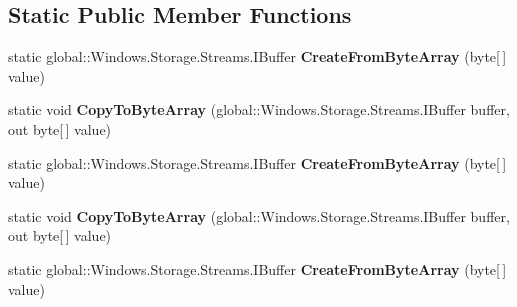 \subsection*{Static Public Member Functions}
\begin{DoxyCompactItemize}
\item 
\mbox{\label{class_windows_1_1_security_1_1_cryptography_1_1_cryptographic_buffer_a9b2cc70a831cb99787d82c5485f22336}} 
static global\+::\+Windows.\+Storage.\+Streams.\+I\+Buffer {\bfseries Create\+From\+Byte\+Array} (byte\mbox{[}$\,$\mbox{]} value)
\item 
\mbox{\label{class_windows_1_1_security_1_1_cryptography_1_1_cryptographic_buffer_a7ee39bbf3affcdc23c5f7bff32232eeb}} 
static void {\bfseries Copy\+To\+Byte\+Array} (global\+::\+Windows.\+Storage.\+Streams.\+I\+Buffer buffer, out byte\mbox{[}$\,$\mbox{]} value)
\item 
\mbox{\label{class_windows_1_1_security_1_1_cryptography_1_1_cryptographic_buffer_a9b2cc70a831cb99787d82c5485f22336}} 
static global\+::\+Windows.\+Storage.\+Streams.\+I\+Buffer {\bfseries Create\+From\+Byte\+Array} (byte\mbox{[}$\,$\mbox{]} value)
\item 
\mbox{\label{class_windows_1_1_security_1_1_cryptography_1_1_cryptographic_buffer_a7ee39bbf3affcdc23c5f7bff32232eeb}} 
static void {\bfseries Copy\+To\+Byte\+Array} (global\+::\+Windows.\+Storage.\+Streams.\+I\+Buffer buffer, out byte\mbox{[}$\,$\mbox{]} value)
\item 
\mbox{\label{class_windows_1_1_security_1_1_cryptography_1_1_cryptographic_buffer_a9b2cc70a831cb99787d82c5485f22336}} 
static global\+::\+Windows.\+Storage.\+Streams.\+I\+Buffer {\bfseries Create\+From\+Byte\+Array} (byte\mbox{[}$\,$\mbox{]} value)
\item 
\mbox{\label{class_windows_1_1_security_1_1_cryptography_1_1_cryptographic_buffer_a7ee39bbf3affcdc23c5f7bff32232eeb}} 

\end{DoxyCompactItemize}
